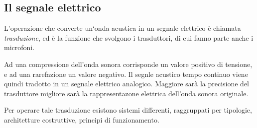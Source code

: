 \subsection{Il segnale elettrico}

L’operazione che converte un‘onda acustica in un segnale elettrico è chiamata
\emph{trasduzione}, ed è la funzione che svolgono i trasduttori, di cui fanno
parte anche i microfoni.

\bigskip

Ad una compressione dell’onda sonora corrisponde un valore positivo di tensione,
e ad una rarefazione un valore negativo. Il segnle acustico tempo continuo viene
quindi tradotto in un segnale elettrico analogico. Maggiore sarà la precisione del
trasduttore migliore sarà la rappresentazone elettrica dell'onda sonora originale.

Per operare tale trasduzione esistono sistemi differenti, raggruppati per tipologie,
architetture costruttive, principi di funzionamento.

\clearpage

